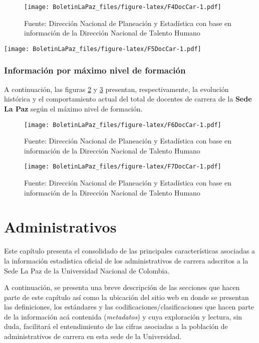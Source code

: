 \documentclass[
]{book}
\begin{document}
\begin{figure}
\centering
\texttt{[image: BoletinLaPaz\_files/figure-latex/F4DocCar-1.pdf]}
\caption{\label{fig:F4DocCar}Fuente: Dirección Nacional de Planeación y Estadística con base en información de la Dirección Nacional de Talento Humano}
\end{figure}

\texttt{[image: BoletinLaPaz\_files/figure-latex/F5DocCar-1.pdf]}

\hypertarget{informaciuxf3n-por-muxe1ximo-nivel-de-formaciuxf3n}{%
\subsection{Información por máximo nivel de formación}\label{informaciuxf3n-por-muxe1ximo-nivel-de-formaciuxf3n}}

A continuación, las figuras \ref{fig:F6DocCar} y \ref{fig:F7DocCar} presentan, respectivamente, la evolución histórica y el comportamiento actual del total de docentes de carrera de la \textbf{Sede La Paz} según el máximo nivel de formación.

\begin{figure}
\centering
\texttt{[image: BoletinLaPaz\_files/figure-latex/F6DocCar-1.pdf]}
\caption{\label{fig:F6DocCar}Fuente: Dirección Nacional de Planeación y Estadística con base en información de la Dirección Nacional de Talento Humano}
\end{figure}

\begin{figure}
\centering
\texttt{[image: BoletinLaPaz\_files/figure-latex/F7DocCar-1.pdf]}
\caption{\label{fig:F7DocCar}Fuente: Dirección Nacional de Planeación y Estadística con base en información de la Dirección Nacional de Talento Humano}
\end{figure}

\hypertarget{Admi}{%
\chapter{Administrativos}\label{Admi}}

Este capítulo presenta el consolidado de las principales características asociadas a la información estadística oficial de los administrativos de carrera adscritos a la Sede La Paz de la Universidad Nacional de Colombia.

A continuación, se presenta una breve descripción de las secciones que hacen parte de este capítulo así como la ubicación del sitio web en donde se presentan las definiciones, los estándares y las codificaciones/clasificaciones que hacen parte de la información acá contenida (\emph{metadatos}) y cuya exploración y lectura, sin duda, facilitará el entendimiento de las cifras asociadas a la población de administrativos de carrera en esta sede de la Universidad.
\end{document}
